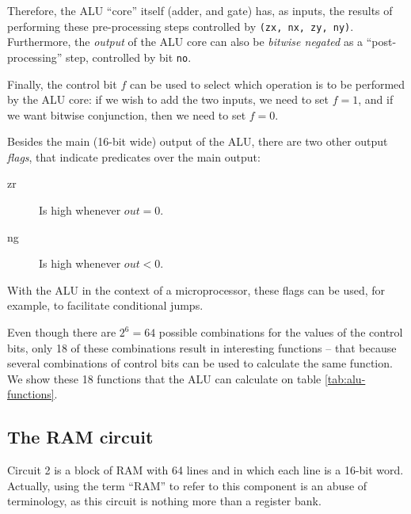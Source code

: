 \documentclass[a4paper]{article}
\begin{document}
            Therefore, the ALU ``core'' itself (adder, and gate) has, as inputs, the results of
            performing these pre-processing steps controlled by \texttt{(zx, nx, zy, ny)}.
            Furthermore, the \emph{output} of the ALU core can also be \emph{bitwise negated} as a
            ``post-processing'' step, controlled by bit \texttt{no}.

            Finally, the control bit $f$ can be used to select which operation is to be performed by
            the ALU core: if we wish to add the two inputs, we need to set $f = 1$, and if we want
            bitwise conjunction, then we need to set $f = 0$.

            Besides the main (16-bit wide) output of the ALU, there are two other output
            \emph{flags}, that indicate predicates over the main output:
            \begin{description}
                \item[zr] Is high whenever $out = 0$.
                \item[ng] Is high whenever $out < 0$.
            \end{description}

            With the ALU in the context of a microprocessor, these flags can be used, for example,
            to facilitate conditional jumps.

            Even though there are $2^{6} = 64$ possible combinations for the values of the control
            bits, only 18 of these combinations result in interesting functions -- that because
            several combinations of control bits can be used to calculate the same function. We show
            these 18 functions that the ALU can calculate on table \ref{tab:alu-functions}.
            



        \subsection{The RAM circuit}
        \label{subsec:ram-circuit}
            Circuit 2 is a block of RAM with 64 lines and in which each line is a 16-bit word.
            Actually, using the term ``RAM'' to refer to this component is an abuse of terminology,
            as this circuit is nothing more than a register bank.
\end{document}
